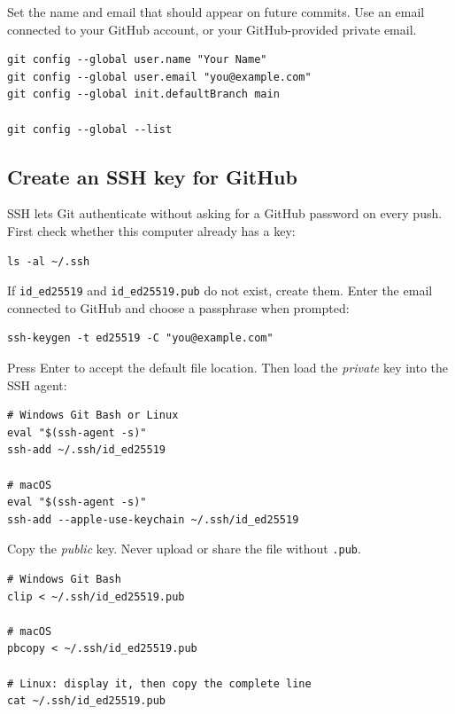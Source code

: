 Set the name and email that should appear on future commits. Use an email
connected to your GitHub account, or your GitHub-provided private email.

\begin{lstlisting}[style=mlterminal]
git config --global user.name "Your Name"
git config --global user.email "you@example.com"
git config --global init.defaultBranch main

git config --global --list
\end{lstlisting}

\subsection{Create an SSH key for GitHub}

SSH lets Git authenticate without asking for a GitHub password on every push.
First check whether this computer already has a key:

\begin{lstlisting}[style=mlterminal]
ls -al ~/.ssh
\end{lstlisting}

If \texttt{id\_ed25519} and \texttt{id\_ed25519.pub} do not exist, create them.
Enter the email connected to GitHub and choose a passphrase when prompted:

\begin{lstlisting}[style=mlterminal]
ssh-keygen -t ed25519 -C "you@example.com"
\end{lstlisting}

Press Enter to accept the default file location. Then load the \emph{private}
key into the SSH agent:

\begin{lstlisting}[style=mlterminal]
# Windows Git Bash or Linux
eval "$(ssh-agent -s)"
ssh-add ~/.ssh/id_ed25519

# macOS
eval "$(ssh-agent -s)"
ssh-add --apple-use-keychain ~/.ssh/id_ed25519
\end{lstlisting}

Copy the \emph{public} key. Never upload or share the file without
\texttt{.pub}.

\begin{lstlisting}[style=mlterminal]
# Windows Git Bash
clip < ~/.ssh/id_ed25519.pub

# macOS
pbcopy < ~/.ssh/id_ed25519.pub

# Linux: display it, then copy the complete line
cat ~/.ssh/id_ed25519.pub
\end{lstlisting}

